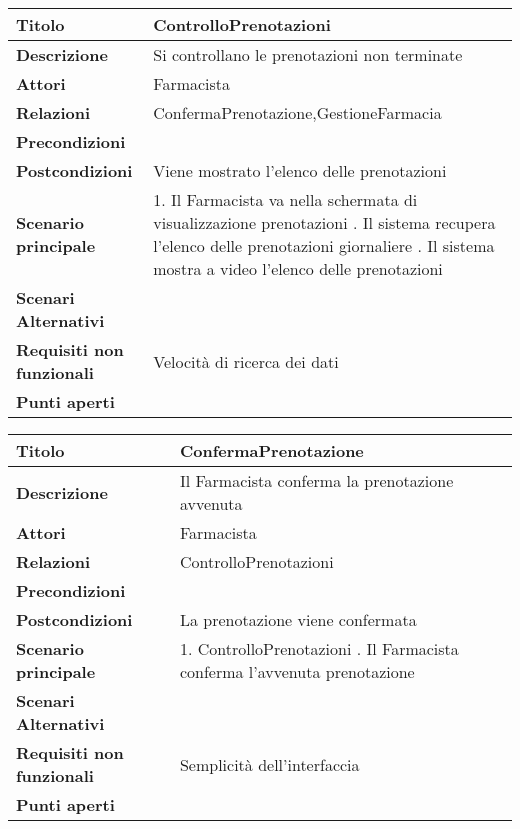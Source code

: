 \begin{tabular} {|P{4.5cm}|P{12.5cm}|}
\hline
  \textbf{Titolo} & ControlloPrenotazioni\\
\hline
  \textbf{Descrizione} & Si controllano le prenotazioni non terminate\\
\hline
  \textbf{Attori} & Farmacista\\
\hline
  \textbf{Relazioni} & ConfermaPrenotazione,GestioneFarmacia\\
\hline
  \textbf{Precondizioni} &\\
\hline
  \textbf{Postcondizioni} & Viene mostrato l'elenco delle prenotazioni\\
\hline
  \textbf{Scenario principale} & 1. Il Farmacista va nella schermata di visualizzazione prenotazioni . Il sistema recupera l'elenco delle prenotazioni giornaliere . Il sistema mostra a video l'elenco delle prenotazioni\\
\hline
  \textbf{Scenari Alternativi} &\\
\hline
  \textbf{Requisiti non funzionali} & Velocità di ricerca dei dati\\
\hline
  \textbf{Punti aperti} &\\
\hline
\end{tabular}
\hfill
\break


\begin{tabular} {|P{4.5cm}|P{12.5cm}|}
\hline
  \textbf{Titolo} & ConfermaPrenotazione\\
\hline
  \textbf{Descrizione} & Il Farmacista conferma la prenotazione avvenuta\\
\hline
  \textbf{Attori} & Farmacista\\
\hline
  \textbf{Relazioni} & ControlloPrenotazioni\\
\hline
  \textbf{Precondizioni} &\\
\hline
  \textbf{Postcondizioni} & La prenotazione viene confermata\\
\hline
  \textbf{Scenario principale} & 1. ControlloPrenotazioni . Il Farmacista conferma l'avvenuta prenotazione\\
\hline
  \textbf{Scenari Alternativi} & \\
\hline
  \textbf{Requisiti non funzionali} & Semplicità dell'interfaccia\\
\hline
  \textbf{Punti aperti} &\\
\hline
\end{tabular}
\hfill
\break


